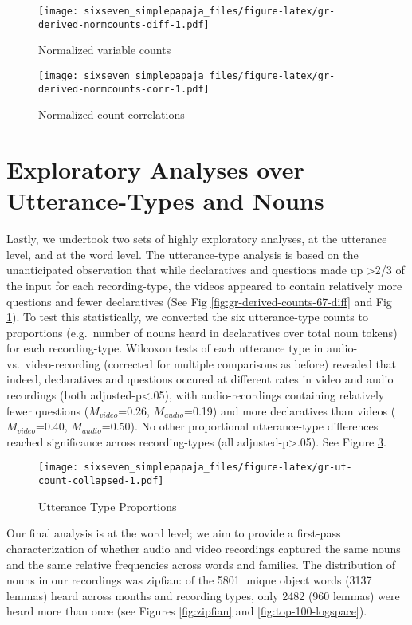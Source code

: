 \documentclass[floatsintext,man]{apa6}
\theoremstyle{definition}
\theoremstyle{definition}
\theoremstyle{definition}
\theoremstyle{remark}
\begin{document}
\begin{figure}
\centering
\texttt{[image: sixseven\_simplepapaja\_files/figure-latex/gr-derived-normcounts-diff-1.pdf]}
\caption{\label{fig:gr-derived-normcounts-diff}Normalized variable counts}
\end{figure}

\begin{figure}
\centering
\texttt{[image: sixseven\_simplepapaja\_files/figure-latex/gr-derived-normcounts-corr-1.pdf]}
\caption{\label{fig:gr-derived-normcounts-corr}Normalized count
correlations}
\end{figure}

\section{Exploratory Analyses over Utterance-Types and
Nouns}\label{exploratory-analyses-over-utterance-types-and-nouns}

Lastly, we undertook two sets of highly exploratory analyses, at the
utterance level, and at the word level. The utterance-type analysis is
based on the unanticipated observation that while declaratives and
questions made up \textgreater{}2/3 of the input for each
recording-type, the videos appeared to contain relatively more questions
and fewer declaratives (See Fig \ref{fig:gr-derived-counts-67-diff} and
Fig \ref{fig:gr-derived-normcounts-diff}). To test this statistically,
we converted the six utterance-type counts to proportions (e.g.~number
of nouns heard in declaratives over total noun tokens) for each
recording-type. Wilcoxon tests of each utterance type in audio-
vs.~video-recording (corrected for multiple comparisons as before)
revealed that indeed, declaratives and questions occured at different
rates in video and audio recordings (both adjusted-p\textless{}.05),
with audio-recordings containing relatively fewer questions
(\(M_{video}\)=0.26, \(M_{audio}\)=0.19) and more declaratives than
videos (\(M_{video}\)=0.40, \(M_{audio}\)=0.50). No other proportional
utterance-type differences reached significance across recording-types
(all adjusted-p\textgreater{}.05). See Figure
\ref{fig:gr-ut-count-collapsed}.

\begin{figure}
\centering
\texttt{[image: sixseven\_simplepapaja\_files/figure-latex/gr-ut-count-collapsed-1.pdf]}
\caption{\label{fig:gr-ut-count-collapsed}Utterance Type Proportions}
\end{figure}

Our final analysis is at the word level; we aim to provide a first-pass
characterization of whether audio and video recordings captured the same
nouns and the same relative frequencies across words and families. The
distribution of nouns in our recordings was zipfian: of the 5801 unique
object words (3137 lemmas) heard across months and recording types, only
2482 (960 lemmas) were heard more than once (see Figures
\ref{fig:zipfian} and \ref{fig:top-100-logspace}).
\end{document}
